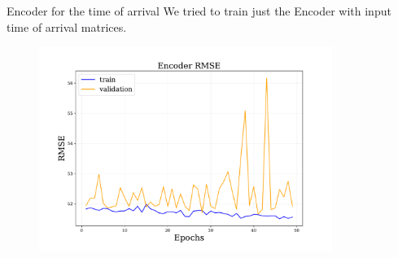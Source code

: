\documentclass{beamer}
\begin{document}
\begin{frame}{Encoder for the time of arrival}
    We tried to train just the Encoder with input time of arrival matrices.
    \begin{figure}
        \centering
        \includegraphics[width=0.85\textwidth]{figures/encoder_rmse.pdf}
    \end{figure}
        
\end{frame}



    
\end{document}
